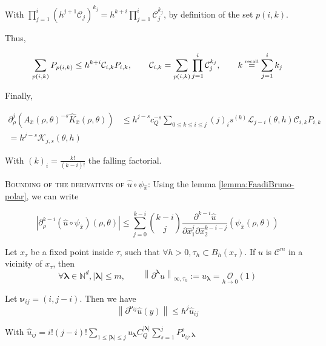 ﻿\documentclass{article}
\begin{document}
With $\displaystyle{\prod_{j=1}^{i}\left(h^{j+1}\mathcal C_j\right)^{k_j}} = h^{k+i}\prod_{j=1}^{i}\mathcal C_j^{k_j}$, by definition of the set $p(i, k)$.

Thus,

\begin{equation}
  \sum_{p(i,k)}P_{p(i, k)} \leq h^{k+i}\mathcal C_{i,k}P_{i,k}, \qquad \mathcal C_{i,k} = \sum_{p(i, k)}\prod_{j=1}^{i}\mathcal C_j^{k_j}, \qquad k \overset{\text{\tiny recall}}{=} \sum_{j=1}^{i}k_j
\end{equation}

Finally,

\begin{align}
  \partial^j_\rho\left(A_{\hat x}(\rho, \theta)^{-s}\hat K_{\hat x}(\rho, \theta)\right) & \leq h^{j-s}c_Q^{-s}\sum_{0\leq k\leq i\leq j}(j)_is^{(k)}\mathcal L_{j-i}(\theta, h)\mathcal C_{i,k}P_{i,k} \\
  = h^{j-s}\mathcal K_{j,s}(\theta, h)
\end{align}

With $\displaystyle{(k)_i = \frac{k!}{(k-i)!}}$ the falling factorial.

\textsc{Bounding of the derivatives of $\hat u\circ\psi_{\hat x}$}: Using the lemma \ref{lemma:FaadiBruno-polar}, we can write

\begin{equation}
  \left|\partial^{k-i}_\rho(\hat u\circ\psi_{\hat x})(\rho, \theta)\right| \leq\sum_{j=0}^{k-i}\binom{k-i}{j}\frac{\partial^{k-i}\hat u}{\partial\hat x_1^j\partial \hat x_2^{k-i-j}}(\psi_{\hat x}(\rho, \theta))
\end{equation}

\begin{lemma}\label{u-derivative-bound}
  Let $x_\tau$ be a fixed point inside $\tau$, such that $\forall h>0, \tau_h\subset B_h(x_\tau)$. If $u$ is $\mathcal C^m$ in a vicinity of $x_\tau$, then
  \begin{equation}
    \forall\bm\lambda\in\mathbb N^d, |\bm\lambda|\leq m,\qquad \left\|\partial^{\bm\lambda}u\right\|_{\infty,\tau_h} := u_{\bm\lambda} = \underset{h\to 0}{\mathcal O}(1)
  \end{equation}
\end{lemma}

\begin{lemma}\label{u-hat-derivative-bound}
  Let $\bm\nu_{ij} = (i, j - i)$. Then we have
  \begin{equation}
    \left\|\partial^{\bm\nu_{ij}}\hat u(\hat y)\right\| \leq h^j\hat u_{ij}
  \end{equation}

  With $\displaystyle{\hat u_{ij} = i!(j-i)!\sum_{1\leq|\bm\lambda|\leq j}u_{\bm\lambda}C_Q^{|\bm\lambda|}\sum_{s=1}^{j}P^s_{\bm\nu_{ij}, \bm\lambda}}$
\end{lemma}
\end{document}
